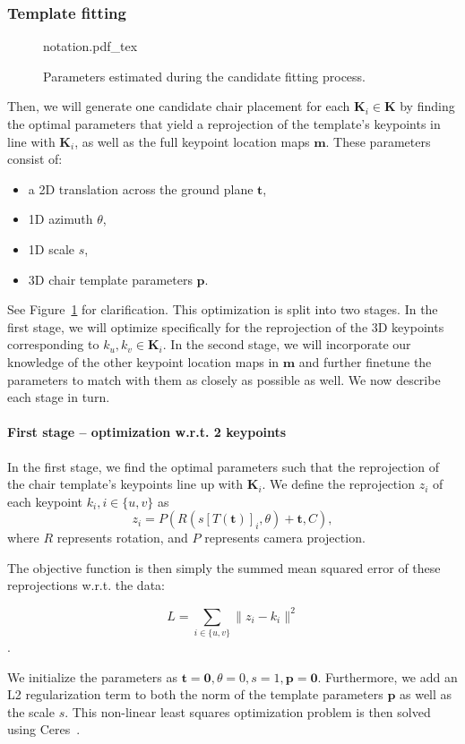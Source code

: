 \documentclass[10pt,twocolumn,letterpaper]{article}
\newcommand{\bb}[1]{{\bm{#1}}}
\begin{document}
\subsubsection{Template fitting}
\label{sssec:ch4:template_fitting}
\begin{figure}[h!t]
    \def\svgwidth{\linewidth}
    {notation.pdf_tex}
    \caption{Parameters estimated during the candidate fitting process.}
    \label{fig:ch4:fitting_parameters}
\end{figure}
Then, we will generate one candidate chair placement for each $\bb{K}_i \in \bb{K}$
by finding the optimal parameters that yield a reprojection of the template's keypoints in line with $\bb{K}_i$,
as well as the full keypoint location maps $\bb{m}$.
These parameters consist of:
\begin{itemize}
    \item a 2D translation across the ground plane $\bb{t}$,
    \item 1D azimuth $\theta$,
    \item 1D scale $s$,
    \item 3D chair template parameters $\bb{p}$.
\end{itemize}
See Figure~\ref{fig:ch4:fitting_parameters} for clarification.  This
optimization is split into two stages.  In the first stage, we will optimize
specifically for the reprojection of the 3D keypoints corresponding to $k_u,
k_v \in \bb{K}_i$.  In the second stage, we will incorporate our knowledge of
the other keypoint location maps in $\bb{m}$ and further finetune the
parameters to match with them as closely as possible as well.  We now describe
each stage in turn.

\paragraph{First stage -- optimization w.r.t. 2 keypoints}
In the first stage, we find the optimal parameters such that the reprojection of the chair template's keypoints line up with $\bb{K}_i$.
We define the reprojection $z_i$ of each keypoint $k_i, i \in \{u, v\}$ as
%
\[ z_i = P(R(s[T(\bb{t})]_i, \theta) + \bb{t}, C), \]
%
where $R$ represents rotation, and $P$ represents camera projection.

The objective function is then simply the summed mean squared error of these reprojections w.r.t. the data:

\[ L = \sum_{i \in \{u, v\}} \|z_i - k_i \|^2 \]. 

We initialize the parameters as $\bb{t} = \bb{0}, \theta = 0, s = 1,
\bb{p} = \bb{0}$. Furthermore, we add an L2 regularization term to both
the norm of the template parameters $\bb{p}$ as well as the scale $s$.
This non-linear least squares optimization problem is then solved using Ceres~\cite{Ceres}.
\end{document}
